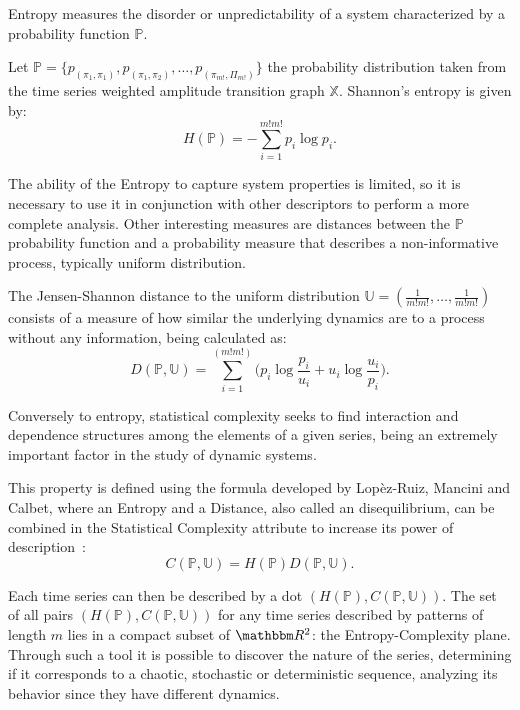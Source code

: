 \documentclass{isprs}
\begin{document}
	Entropy measures the disorder or unpredictability of a system characterized by a probability function $\mathbb{P}$.
	
	Let $\mathbb{P} = \{p_{(\pi_1, \pi_1)}, p_{(\pi_1, \pi_2)}, \dots, p_{(\pi_{m!}, \Pi_{m!})} \}$  the probability distribution taken from the time series weighted amplitude transition graph $\mathbb{X}$.
	Shannon's entropy is given by:	
	\begin{equation}
	H(\mathbb{P}) = -\sum_{i=1}^{m!m!} p_i \log p_i .
	\label{eq:Entropia}
	\end{equation}
	
The ability of the Entropy to capture system properties is limited, so it is necessary to use it in conjunction with other descriptors to perform a more complete analysis.
Other interesting measures are distances between the $\mathbb{P}$ probability function and a probability measure that describes a non-informative process, typically uniform distribution.
	
	The Jensen-Shannon distance to the uniform distribution $\mathbb{U} = (\frac{1}{m!m!}, \dots, \frac{1}{m!m!})$ consists of a measure of how similar the underlying dynamics are to a process without any information, being calculated as:
	\begin{equation}
	D(\mathbb{P}, \mathbb{U}) = \sum_{i=1}^{(m!m!)} \Big(p_i \log\frac{p_i}{u_i} +
	u_i \log\frac{u_i}{p_i}
	\Big).
	\end{equation}
	
	Conversely to entropy, statistical complexity seeks to find interaction and dependence structures among the elements of a given series, being an extremely important factor in the study of dynamic systems.
	
	This property is defined using the formula developed by Lopèz-Ruiz, Mancini and Calbet, where an Entropy and a Distance, also called an disequilibrium, can be combined in the Statistical Complexity attribute to increase its power of description~\citep{Feldman2008information,Feldman1998Statistical,Lopez1995statistical}:
	\begin{equation}
	C(\mathbb{P}, \mathbb{U}) = H(\mathbb{P}) D(\mathbb{P}, \mathbb{U}).
	\end{equation}
	
	Each time series can then be described by a dot $(H(\mathbb{P}), C(\mathbb{P}, \mathbb{U}))$.
	The set of all pairs $(H(\mathbb{P}), C(\mathbb{P}, \mathbb{U}))$ for any time series described by patterns of length $m$ lies in a compact subset of $\mathbbm R^2$: the Entropy-Complexity plane. 
	Through such a tool it is possible to discover the nature of the series, determining if it corresponds to a chaotic, stochastic or deterministic sequence, analyzing its behavior since they have different dynamics.
	
\end{document}
